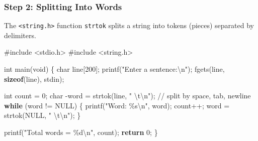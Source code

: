 \documentclass[
  letterpaper,
  DIV=11,
  numbers=noendperiod]{scrreprt}
\newenvironment{Shaded}{\begin{snugshade}}{\end{snugshade}}
\newcommand{\CommentTok}[1]{\textcolor[rgb]{0.37,0.37,0.37}{#1}}
\newcommand{\ControlFlowTok}[1]{\textcolor[rgb]{0.00,0.23,0.31}{\textbf{#1}}}
\newcommand{\DataTypeTok}[1]{\textcolor[rgb]{0.68,0.00,0.00}{#1}}
\newcommand{\DecValTok}[1]{\textcolor[rgb]{0.68,0.00,0.00}{#1}}
\newcommand{\ImportTok}[1]{\textcolor[rgb]{0.00,0.46,0.62}{#1}}
\newcommand{\KeywordTok}[1]{\textcolor[rgb]{0.00,0.23,0.31}{\textbf{#1}}}
\newcommand{\NormalTok}[1]{\textcolor[rgb]{0.00,0.23,0.31}{#1}}
\newcommand{\OperatorTok}[1]{\textcolor[rgb]{0.37,0.37,0.37}{#1}}
\newcommand{\PreprocessorTok}[1]{\textcolor[rgb]{0.68,0.00,0.00}{#1}}
\newcommand{\SpecialCharTok}[1]{\textcolor[rgb]{0.37,0.37,0.37}{#1}}
\newcommand{\StringTok}[1]{\textcolor[rgb]{0.13,0.47,0.30}{#1}}
\begin{document}
\subsubsection{Step 2: Splitting Into
Words}\label{step-2-splitting-into-words}

The \texttt{\textless{}string.h\textgreater{}} function \texttt{strtok}
splits a string into tokens (pieces) separated by delimiters.

\begin{Shaded}
\begin{Highlighting}[]
\PreprocessorTok{\#include }\ImportTok{\textless{}stdio.h\textgreater{}}
\PreprocessorTok{\#include }\ImportTok{\textless{}string.h\textgreater{}}

\DataTypeTok{int}\NormalTok{ main}\OperatorTok{(}\DataTypeTok{void}\OperatorTok{)} \OperatorTok{\{}
    \DataTypeTok{char}\NormalTok{ line}\OperatorTok{[}\DecValTok{200}\OperatorTok{];}
\NormalTok{    printf}\OperatorTok{(}\StringTok{"Enter a sentence:}\SpecialCharTok{\textbackslash{}n}\StringTok{"}\OperatorTok{);}
\NormalTok{    fgets}\OperatorTok{(}\NormalTok{line}\OperatorTok{,} \KeywordTok{sizeof}\OperatorTok{(}\NormalTok{line}\OperatorTok{),}\NormalTok{ stdin}\OperatorTok{);}

    \DataTypeTok{int}\NormalTok{ count }\OperatorTok{=} \DecValTok{0}\OperatorTok{;}
    \DataTypeTok{char} \OperatorTok{{-}}\NormalTok{word }\OperatorTok{=}\NormalTok{ strtok}\OperatorTok{(}\NormalTok{line}\OperatorTok{,} \StringTok{" }\SpecialCharTok{\textbackslash{}t\textbackslash{}n}\StringTok{"}\OperatorTok{);}  \CommentTok{// split by space, tab, newline}
    \ControlFlowTok{while} \OperatorTok{(}\NormalTok{word }\OperatorTok{!=}\NormalTok{ NULL}\OperatorTok{)} \OperatorTok{\{}
\NormalTok{        printf}\OperatorTok{(}\StringTok{"Word: }\SpecialCharTok{\%s\textbackslash{}n}\StringTok{"}\OperatorTok{,}\NormalTok{ word}\OperatorTok{);}
\NormalTok{        count}\OperatorTok{++;}
\NormalTok{        word }\OperatorTok{=}\NormalTok{ strtok}\OperatorTok{(}\NormalTok{NULL}\OperatorTok{,} \StringTok{" }\SpecialCharTok{\textbackslash{}t\textbackslash{}n}\StringTok{"}\OperatorTok{);}
    \OperatorTok{\}}

\NormalTok{    printf}\OperatorTok{(}\StringTok{"Total words = }\SpecialCharTok{\%d\textbackslash{}n}\StringTok{"}\OperatorTok{,}\NormalTok{ count}\OperatorTok{);}
    \ControlFlowTok{return} \DecValTok{0}\OperatorTok{;}
\OperatorTok{\}}
\end{Highlighting}
\end{Shaded}
\end{document}
